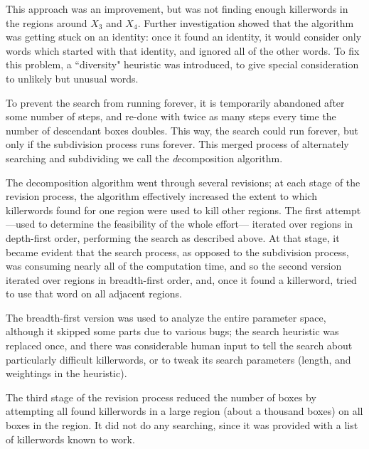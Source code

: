 \begin{remark}
This approach was an improvement, but was not finding enough killerwords in the regions 
around $X_3$ and $X_4$.  Further investigation showed that the 
algorithm was getting stuck on an identity: once it found an identity, 
it would consider only words which started with that identity, and 
ignored all of the other words.  To fix this problem, a ``diversity" 
heuristic was introduced, to give special consideration to unlikely but 
unusual words.

To prevent the search from running forever, it is 
temporarily abandoned after some number of steps, and re-done 
with twice as many steps every time the number of descendant boxes 
doubles.  This way, the search could run forever, but only if
the subdivision process runs forever. 
This merged process of alternately searching and subdividing we
call the {\textit decomposition algorithm}.

The decomposition algorithm went through several revisions; at each stage
of the revision process, 
the algorithm effectively increased the extent to which killerwords 
found for one region were used to kill other regions.  The first 
attempt---used to determine the feasibility of the whole effort--- 
iterated over regions in depth-first order, performing the search as 
described above.
At that stage, it became evident that the search process, as 
opposed to the subdivision process, 
was consuming nearly all of the computation time, and so the second 
version iterated over regions in breadth-first order, and, once it 
found a killerword, tried to use that word on all adjacent regions.

The breadth-first version was used to analyze the entire parameter 
space, although it skipped some parts due to various bugs; the search 
heuristic was replaced once, and there was considerable human input 
to tell the search about particularly difficult killerwords, or to tweak 
its search parameters (length, and weightings in the heuristic).

The third stage of the revision process reduced the number of boxes by attempting all found 
killerwords in a large region (about a thousand boxes) on all boxes 
in the region.  It did not  do any searching, since it was provided with a 
list of killerwords known to work.


\end{remark}
